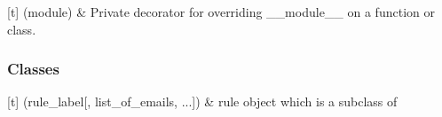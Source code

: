 \documentclass[letterpaper,10pt,english]{sphinxmanual}
\begin{document}
\begin{savenotes}\sphinxattablestart
\sphinxthistablewithglobalstyle
\sphinxthistablewithnovlinesstyle
\centering
\begin{tabulary}{\linewidth}[t]{}
\sphinxtoprule
\sphinxtableatstartofbodyhook
\sphinxAtStartPar
{}(module)
&
\sphinxAtStartPar
Private decorator for overriding \_\_module\_\_ on a function or class.
\\
\sphinxbottomrule
\end{tabulary}
\sphinxtableafterendhook\par
\sphinxattableend\end{savenotes}
\subsubsection*{Classes}


\begin{savenotes}\sphinxattablestart
\sphinxthistablewithglobalstyle
\sphinxthistablewithnovlinesstyle
\centering
\begin{tabulary}{\linewidth}[t]{}
\sphinxtoprule
\sphinxtableatstartofbodyhook
\sphinxAtStartPar
{\hyperref[\detokenize{_autosummary/gmail_rules.rules.copy_to:gmail_rules.rules.copy_to.Copy_To}]{}}(rule\_label{[}, list\_of\_emails, ...{]})
&
\sphinxAtStartPar
{\hyperref[\detokenize{_autosummary/gmail_rules.rules.copy_to:gmail_rules.rules.copy_to.Copy_To}]{}} rule object which is a sub\sphinxhyphen{}class of 
\\
\sphinxbottomrule
\end{tabulary}
\sphinxtableafterendhook\par
\sphinxattableend\end{savenotes}
\end{document}

